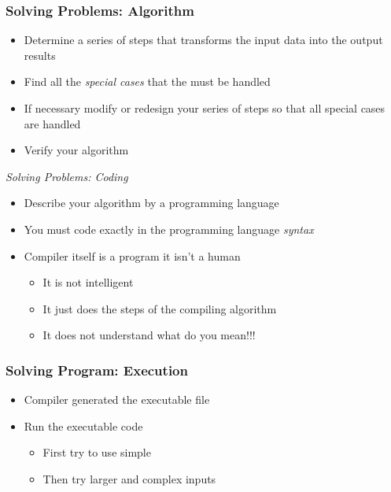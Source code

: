 \documentclass{../c-lecture}
\begin{document}
\begin{frame}
  \frametitle{Solving Problems: Algorithm}
  \begin{itemize}
    \item
      Determine a series of steps that transforms the input data into the output
      results
    \item
      Find all the \textit{\color{Orange} special cases} that the must be
      handled
    \item
      If necessary modify or redesign your series of steps so that all special
      cases are handled
    \item Verify your algorithm
  \end{itemize}
\end{frame}

\begin{frame}
  \textit{Solving Problems: Coding}
  \begin{itemize}
    \item Describe your algorithm by a programming language
    \item
      You must code exactly in the programming language
      \textit{\color{Orange} syntax}
    \item Compiler itself is a program it isn’t a human
    \begin{itemize}
      \item It is not intelligent
      \item It just does the steps of the compiling algorithm
      \item It does not understand what do you mean!!!
    \end{itemize}
  \end{itemize}
\end{frame}

\begin{frame}
  \frametitle{Solving Program: Execution}
  \begin{itemize}
    \item Compiler generated the executable file
    \item Run the executable code
    \begin{itemize}
      \item First try to use simple
      \item Then try larger and complex inputs
    \end{itemize}
  \end{itemize}
\end{frame}
\end{document}
